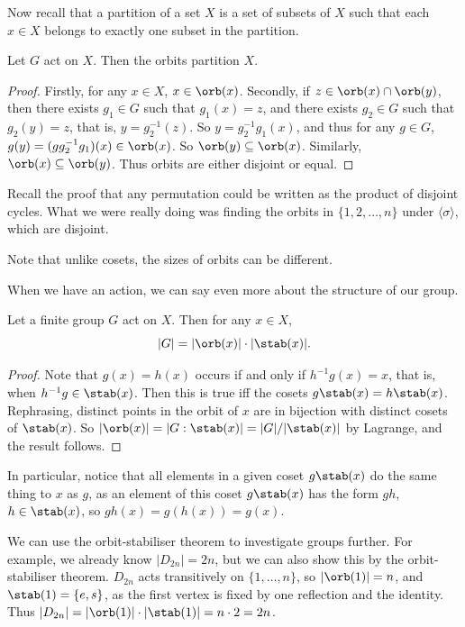 \documentclass[a4]{scrreprt}
\begin{document}
Now recall that a partition of a set $X$ is a set of subsets of $X$ such that each $x \in X$ belongs to exactly one subset in the partition.

\begin{lemma}
	Let $G$ act on $X$. Then the orbits partition $X$.
\end{lemma}
\begin{proof}
	Firstly, for any $x \in X$, $x \in \orb(x)$. Secondly, if $z \in \orb(x) \cap \orb(y)$, then there exists $g_1 \in G$ such that $g_1(x) = z$, and there exists $g_2 \in G$ such that $g_2 (y) = z$, that is, $y = g_2^{-1}(z)$. So $y = g_2^{-1} g_1 (x)$, and thus for any $g \in G$, $g(y) = (g g_2^{-1} g_1)(x) \in \orb(x)$. So $\orb(y) \subseteq \orb(x)$. Similarly, $\orb(x) \subseteq \orb(y)$. Thus orbits are either disjoint or equal.
\end{proof}

Recall the proof that any permutation could be written as the product of disjoint cycles. What we were really doing was finding the orbits in $\{1, 2, \dots, n\}$ under $\langle \sigma \rangle$, which are disjoint.

\begin{remark}
	Note that unlike cosets, the sizes of orbits can be different.
\end{remark}

When we have an action, we can say even more about the structure of our group.

\begin{theorem}
	Let a finite group $G$ act on $X$. Then for any $x \in X$,
	$$
	|G| = |\orb(x)| \cdot |\stab(x)|.
	$$
\end{theorem}
\begin{proof}
	Note that $g(x) = h(x)$ occurs if and only if $h^{-1} g (x) = x$, that is, when $h^{-1} g \in \stab(x)$. Then this is true iff the cosets $g \stab(x) = h\stab(x)$. Rephrasing, distinct points in the orbit of $x$ are in bijection with distinct cosets of $\stab(x)$. So $|\orb(x)| = |G : \stab(x)| = |G| / |\stab(x) |$ by Lagrange, and the result follows.
\end{proof}

In particular, notice that all elements in a given coset $g \stab(x)$ do the same thing to $x$ as $g$, as an element of this coset $g\stab(x)$ has the form $gh$, $h \in \stab(x)$, so $gh(x) = g(h(x)) = g(x)$.

We can use the orbit-stabiliser theorem to investigate groups further. For example, we already know $|D_{2n}| = 2n$, but we can also show this by the orbit-stabiliser theorem. $D_{2n}$ acts transitively on $\{1, \dots, n\}$, so $|\orb(1)| = n$, and $\stab(1) = \{e, s\}$, as the first vertex is fixed by one reflection and the identity. Thus $|D_{2n}| = |\orb(1)| \cdot |\stab(1)| = n \cdot 2 = 2n$.
\end{document}
